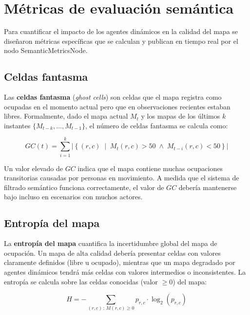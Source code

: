 \section{Métricas de evaluación semántica}%
\label{sec:sol_metrics}

Para cuantificar el impacto de los agentes dinámicos en la calidad del mapa se
diseñaron métricas específicas que se calculan y publican en tiempo real por el
nodo SemanticMetricsNode.

\subsection{Celdas fantasma}

Las \textbf{celdas fantasma} (\textit{ghost cells}) son celdas que el mapa
registra como ocupadas en el momento actual pero que en observaciones recientes
estaban libres. Formalmente, dado el mapa actual $M_t$ y los mapas de los
últimos $k$ instantes $\{M_{t-k}, \ldots, M_{t-1}\}$, el número de celdas
fantasma se calcula como:

\begin{equation}
    GC(t) = \sum_{i=1}^{k} \left|\left\{(r,c) \;\middle|\; M_t(r,c) > 50 \;\wedge\; M_{t-i}(r,c) < 50\right\}\right|
    \label{eq:ghost}
\end{equation}

Un valor elevado de $GC$ indica que el mapa contiene muchas ocupaciones
transitorias causadas por personas en movimiento. A medida que el sistema de
filtrado semántico funciona correctamente, el valor de $GC$ debería mantenerse
bajo incluso en escenarios con muchos actores.

\subsection{Entropía del mapa}

La \textbf{entropía del mapa} cuantifica la incertidumbre global del mapa de
ocupación. Un mapa de alta calidad debería presentar celdas con valores
claramente definidos (libre u ocupado), mientras que un mapa degradado por
agentes dinámicos tendrá más celdas con valores intermedios o inconsistentes.
La entropía se calcula sobre las celdas conocidas (valor $\geq 0$) del mapa:

\begin{equation}
    H = -\sum_{(r,c)\,:\,M(r,c) \geq 0} p_{r,c} \cdot \log_2(p_{r,c})
    \label{eq:entropy}
\end{equation}

